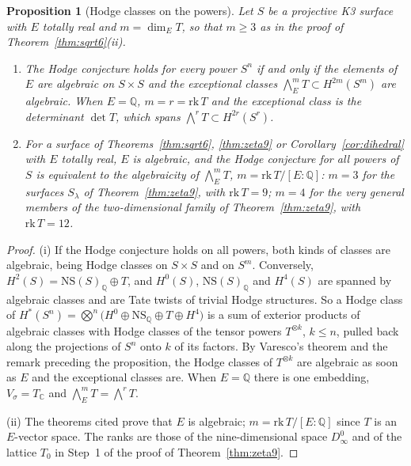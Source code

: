 \documentclass[11pt,reqno]{amsart}
\numberwithin{equation}{section}
\theoremstyle{plain}
\newtheorem{proposition}[theorem]{Proposition}
\theoremstyle{definition}
\newcommand{\QQ}{\mathbb{Q}}
\newcommand{\CC}{\mathbb{C}}
\newcommand{\NS}{\mathrm{NS}}
\begin{document}
\begin{proposition}[Hodge classes on the powers]\label{prop:powers}
Let $S$ be a projective K3 surface with $E$ totally real and $m=\dim_{E}T$, so that $m\ge3$ as in the proof of Theorem~\ref{thm:sqrt6}(ii).
\begin{enumerate}[label=\textup{(\roman*)},leftmargin=2.4em,itemsep=2pt]
\item The Hodge conjecture holds for every power $S^{n}$ if and only if the elements of $E$ are algebraic on $S\times S$ and the exceptional classes $\bigwedge^{m}_{E}T\subset H^{2m}(S^{m})$ are algebraic. When $E=\QQ$, $m=r=\mathrm{rk}\,T$ and the exceptional class is the determinant $\det T$, which spans $\bigwedge^{r}T\subset H^{2r}(S^{r})$.
\item For a surface of Theorems~\ref{thm:sqrt6}, \ref{thm:zeta9} or Corollary~\ref{cor:dihedral} with $E$ totally real, $E$ is algebraic, and the Hodge conjecture for all powers of $S$ is equivalent to the algebraicity of $\bigwedge^{m}_{E}T$, $m=\mathrm{rk}\,T/[E:\QQ]$: $m=3$ for the surfaces $S_{\lambda}$ of Theorem~\ref{thm:zeta9}, with $\mathrm{rk}\,T=9$; $m=4$ for the very general members of the two-dimensional family of Theorem~\ref{thm:zeta9}, with $\mathrm{rk}\,T=12$.
\end{enumerate}
\end{proposition}

\begin{proof}
(i) If the Hodge conjecture holds on all powers, both kinds of classes are algebraic, being Hodge classes on $S\times S$ and on $S^{m}$. Conversely, $H^{2}(S)=\NS(S)_{\QQ}\oplus T$, and $H^{0}(S)$, $\NS(S)_{\QQ}$ and $H^{4}(S)$ are spanned by algebraic classes and are Tate twists of trivial Hodge structures. So a Hodge class of $H^{*}(S^{n})=\bigotimes^{n}\bigl(H^{0}\oplus\NS_{\QQ}\oplus T\oplus H^{4}\bigr)$ is a sum of exterior products of algebraic classes with Hodge classes of the tensor powers $T^{\otimes k}$, $k\le n$, pulled back along the projections of $S^{n}$ onto $k$ of its factors. By Varesco's theorem and the remark preceding the proposition, the Hodge classes of $T^{\otimes k}$ are algebraic as soon as $E$ and the exceptional classes are. When $E=\QQ$ there is one embedding, $V_{\sigma}=T_{\CC}$ and $\bigwedge^{m}_{E}T=\bigwedge^{r}T$.

(ii) The theorems cited prove that $E$ is algebraic; $m=\mathrm{rk}\,T/[E:\QQ]$ since $T$ is an $E$-vector space. The ranks are those of the nine-dimensional space $D_{\infty}^{0}$ and of the lattice $T_{0}$ in Step~1 of the proof of Theorem~\ref{thm:zeta9}.
\end{proof}
\end{document}

